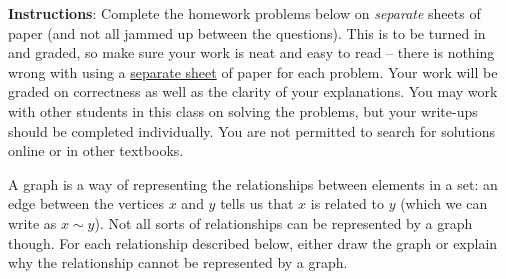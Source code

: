 \documentclass[10pt]{exam}
\begin{document}
\noindent \textbf{Instructions}: Complete the homework problems below on {\em separate} sheets of paper (and not all jammed up between the questions).  This is to be turned in and graded, so make sure your work is neat and easy to read -- there is nothing wrong with using a \underline{separate sheet} of paper for each problem. Your work will be graded on correctness as well as the clarity of your explanations.  You may work with other students in this class on solving the problems, but your write-ups should be completed individually.  You are not permitted to search for solutions online or in other textbooks.

\begin{questions}

	\question[6] A graph is a way of representing the relationships between elements in a set: an edge between the vertices $x$ and $y$ tells us that $x$ is related to $y$ (which we can write as $x \sim y$).  Not all sorts of relationships can be represented by a graph though.  For each relationship described below, either draw the graph or explain why the relationship cannot be represented by a graph.
\end{questions}
\end{document}
